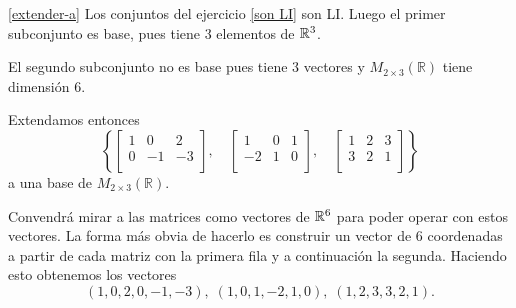 \begin{enumerate}[resume, topsep=6pt, itemsep=.4cm]
    
    \rta 

    \ref{extender-a} Los conjuntos del ejercicio \ref{son LI} son LI. Luego el primer subconjunto es base, pues tiene $3$ elementos de  $\mathbb R^3$. 
    
    El segundo subconjunto no es base pues tiene $3$ vectores y $M_{2\times 3}(\mathbb{R})$ tiene dimensión $6$. 
    
    Extendamos entonces $$\left\{  \begin{bmatrix} 1 & 0 & 2 \\ 0 & -1 & -3 \\ \end{bmatrix}, \quad
    \begin{bmatrix} 1 & 0 & 1 \\ -2 & 1 & 0 \\ \end{bmatrix}, \quad
    \begin{bmatrix} 1 & 2 & 3 \\ 3 & 2 & 1 \\ \end{bmatrix} \right\}$$ a una base de $M_{2\times 3}(\mathbb{R})$.
    
    Convendrá mirar a las matrices como vectores de $\mathbb R^6$ para poder operar con estos vectores. La forma más obvia de hacerlo es construir  un vector de $6$ coordenadas a partir de cada matriz  con la primera fila y a continuación la segunda. Haciendo esto obtenemos los vectores
    $$
    (1, 0, 2, 0, -1, -3),\; (1, 0, 1, -2, 1, 0),\;  (1, 2, 3, 3, 2, 1).
    $$
    

\end{enumerate}
